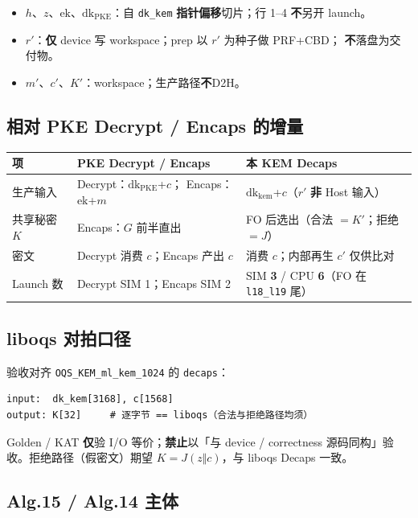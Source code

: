 \documentclass[UTF8,a4paper,11pt]{ctexart}
\begin{document}
\begin{itemize}
  \item $h$、$z$、$\mathrm{ek}$、$\mathrm{dk}_{\mathrm{PKE}}$：自 \texttt{dk\_kem}
        \textbf{指针偏移}切片；行 1--4 \textbf{不}另开 launch。
  \item $r'$：\textbf{仅} device 写 workspace；prep 以 $r'$ 为种子做 PRF+CBD；
        \textbf{不}落盘为交付物。
  \item $m'$、$c'$、$K'$：workspace；生产路径\textbf{不}D2H。
\end{itemize}

\subsection{相对 PKE Decrypt / Encaps 的增量}

\begin{longtable}{@{}L{3.0cm}L{4.4cm}L{5.4cm}@{}}
\toprule
项 & PKE Decrypt / Encaps & \textbf{本 KEM Decaps} \\
\midrule
生产输入 & Decrypt：$\mathrm{dk}_{\mathrm{PKE}}$+$c$；
  Encaps：$\mathrm{ek}$+$m$ &
  $\mathrm{dk}_{\mathrm{kem}}$+$c$（$r'$ \textbf{非} Host 输入） \\
共享秘密 $K$ & Encaps：$G$ 前半直出 &
  FO 后选出（合法 $=K'$；拒绝 $=J$） \\
密文 & Decrypt 消费 $c$；Encaps 产出 $c$ &
  消费 $c$；内部再生 $c'$ 仅供比对 \\
Launch 数 & Decrypt SIM 1；Encaps SIM 2 &
  SIM \textbf{3} / CPU \textbf{6}（FO 在 \texttt{l18\_l19} 尾） \\
\bottomrule
\end{longtable}

\subsection{liboqs 对拍口径}

验收对齐 \texttt{OQS\_KEM\_ml\_kem\_1024} 的 \texttt{decaps}：

\begin{verbatim}
input:  dk_kem[3168], c[1568]
output: K[32]     # 逐字节 == liboqs（合法与拒绝路径均须）
\end{verbatim}

Golden / KAT \textbf{仅}验 I/O 等价；\textbf{禁止}以「与 device / correctness
源码同构」验收。拒绝路径（假密文）期望 $K=J(z\Vert c)$，与 liboqs Decaps 一致。

\subsection{Alg.15 / Alg.14 主体}
\end{document}
